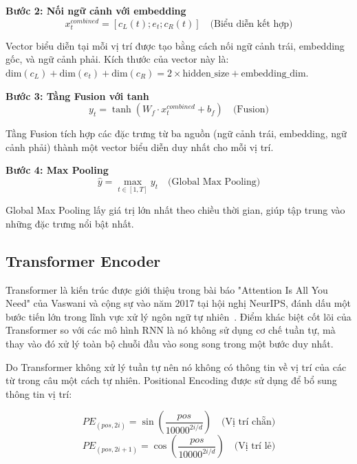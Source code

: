 \documentclass[../BTL.tex]{subfiles}
\begin{document}
\textbf{Bước 2: Nối ngữ cảnh với embedding}
\begin{equation}
    x_t^{combined} = [c_L(t); e_t; c_R(t)] \quad \text{(Biểu diễn kết hợp)}
\end{equation}

Vector biểu diễn tại mỗi vị trí được tạo bằng cách nối ngữ cảnh trái, embedding gốc, và ngữ cảnh phải. Kích thước của vector này là: $\text{dim}(c_L) + \text{dim}(e_t) + \text{dim}(c_R) = 2 \times \text{hidden\_size} + \text{embedding\_dim}$.

\textbf{Bước 3: Tầng Fusion với tanh}
\begin{equation}
    y_t = \tanh(W_f \cdot x_t^{combined} + b_f) \quad \text{(Fusion)}
\end{equation}

Tầng Fusion tích hợp các đặc trưng từ ba nguồn (ngữ cảnh trái, embedding, ngữ cảnh phải) thành một vector biểu diễn duy nhất cho mỗi vị trí.

\textbf{Bước 4: Max Pooling}
\begin{equation}
    \hat{y} = \max_{t \in [1, T]} y_t \quad \text{(Global Max Pooling)}
\end{equation}

Global Max Pooling lấy giá trị lớn nhất theo chiều thời gian, giúp tập trung vào những đặc trưng nổi bật nhất.

\subsection{Transformer Encoder}
Transformer là kiến trúc được giới thiệu trong bài báo "Attention Is All You Need" của Vaswani và cộng sự vào năm 2017 tại hội nghị NeurIPS, đánh dấu một bước tiến lớn trong lĩnh vực xử lý ngôn ngữ tự nhiên~\cite{vaswani2017transformer}. Điểm khác biệt cốt lõi của Transformer so với các mô hình RNN là nó không sử dụng cơ chế tuần tự, mà thay vào đó xử lý toàn bộ chuỗi đầu vào song song trong một bước duy nhất.

Do Transformer không xử lý tuần tự nên nó không có thông tin về vị trí của các từ trong câu một cách tự nhiên. Positional Encoding được sử dụng để bổ sung thông tin vị trí:

\begin{equation}
    PE_{(pos, 2i)} = \sin\left(\frac{pos}{10000^{2i/d}}\right) \quad \text{(Vị trí chẵn)}
\end{equation}
\begin{equation}
    PE_{(pos, 2i+1)} = \cos\left(\frac{pos}{10000^{2i/d}}\right) \quad \text{(Vị trí lẻ)}
\end{equation}
\end{document}
